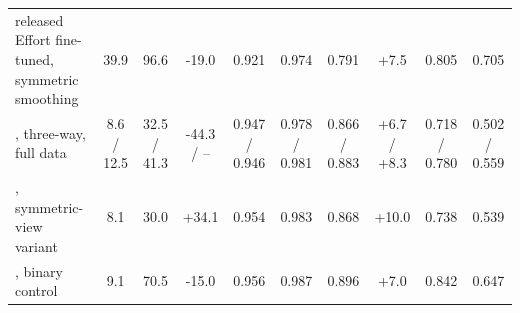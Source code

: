 \begin{tabular}{@{}l cc c cc cc cc@{}}
released Effort fine-tuned, symmetric smoothing & 39.9 & 96.6 & -19.0 & 0.921 & 0.974 & 0.791 & +7.5 & 0.805 & 0.705 \\
\ours{}, three-way, full data & 8.6 / 12.5 & 32.5 / 41.3 & -44.3 / -- & 0.947 / 0.946 & 0.978 / 0.981 & 0.866 / 0.883 & +6.7 / +8.3 & 0.718 / 0.780 & 0.502 / 0.559 \\
\ours{}, symmetric-view variant & 8.1 & 30.0 & +34.1 & 0.954 & 0.983 & 0.868 & +10.0 & 0.738 & 0.539 \\
\ours{}, binary control & 9.1 & 70.5 & -15.0 & 0.956 & 0.987 & 0.896 & +7.0 & 0.842 & 0.647 \\
\bottomrule
\end{tabular}
